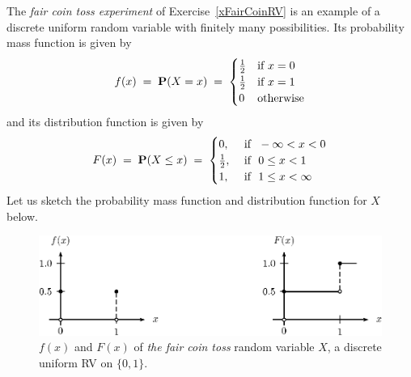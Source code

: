 \begin{example}
The {\em fair coin toss experiment} of Exercise~\ref{xFairCoinRV} is an example of a discrete uniform random variable with finitely many possibilities. 
Its probability mass function is given by 
\[f(x)\;=\;\mathbf{P}(X=x)\;=\;
\begin{cases}
\frac{1}{2} & \text{if } x=0\\
\frac{1}{2} & \text{if } x=1\\
0 & \text{otherwise}
\end{cases}\] 
and its distribution function is given by
\[F(x)\; = \;\mathbf{P}(X \leq x) \;=\;
\begin{cases}
 0, & \text{ if } \ -\infty < x < 0\\
 \frac{1}{2}, & \text{ if } \ 0 \leq x < 1\\
 1,
& \text{ if } \ 1 \leq x < \infty
\end{cases}
\]
Let us sketch the probability mass function and distribution function for $X$ below. 
\begin{figure}[htbp]
\begin{center}
\includegraphics{pstricks/faircoinfF}
\caption{$f(x)$ and $F(x)$ of {\em the fair coin toss} random variable $X$, a discrete uniform RV on $\{0,1\}$.}
\end{center}
\end{figure}
\end{example}

